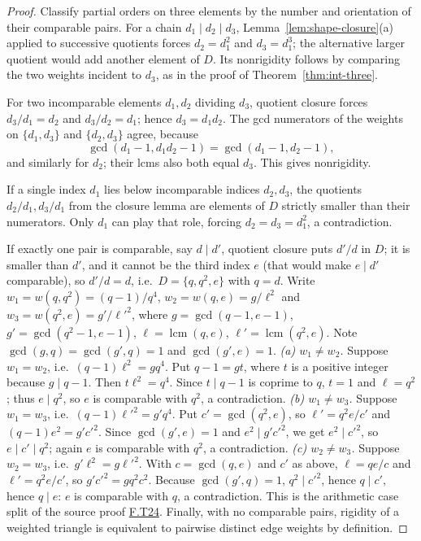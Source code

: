 \documentclass[11pt,oneside,openany]{book}
\theoremstyle{definition}
\theoremstyle{remark}
\newcommand{\lcmop}{\operatorname{lcm}}
\newcommand{\gcdop}{\operatorname{gcd}}
\newcommand{\src}[2]{\href{https://github.com/ukbbi/UNNS/blob/bb8b12d753c600c597feb00df17fe139c7cc65fa/projects/UNNS_MATH_FOUNDATIONS/sources/#1}{#2}}
\begin{document}
\begin{proof}
Classify partial orders on three elements by the number and orientation of their comparable pairs. For a chain \(d_1\mid d_2\mid d_3\), Lemma~\ref{lem:shape-closure}(a) applied to successive quotients forces \(d_2=d_1^2\) and \(d_3=d_1^3\); the alternative larger quotient would add another element of \(D\). Its nonrigidity follows by comparing the two weights incident to \(d_3\), as in the proof of Theorem~\ref{thm:int-three}.

For two incomparable elements \(d_1,d_2\) dividing \(d_3\), quotient closure forces \(d_3/d_1=d_2\) and \(d_3/d_2=d_1\); hence \(d_3=d_1d_2\). The gcd numerators of the weights on \(\{d_1,d_3\}\) and \(\{d_2,d_3\}\) agree, because
\[
 \gcdop(d_1-1,d_1d_2-1)=\gcdop(d_1-1,d_2-1),
\]
and similarly for \(d_2\); their lcms also both equal \(d_3\). This gives nonrigidity.

If a single index \(d_1\) lies below incomparable indices \(d_2,d_3\), the quotients \(d_2/d_1,d_3/d_1\) from the closure lemma are elements of \(D\) strictly smaller than their numerators. Only \(d_1\) can play that role, forcing \(d_2=d_3=d_1^2\), a contradiction.

If exactly one pair is comparable, say \(d\mid d'\), quotient closure puts \(d'/d\) in \(D\); it is smaller than \(d'\), and it cannot be the third index \(e\) (that would make \(e\mid d'\) comparable), so \(d'/d=d\), i.e.\ \(D=\{q,q^2,e\}\) with \(q=d\). Write \(w_1=w(q,q^2)=(q-1)/q^4\), \(w_2=w(q,e)=g/\ell^2\) and \(w_3=w(q^2,e)=g'/\ell'^2\), where \(g=\gcdop(q-1,e-1)\), \(g'=\gcdop(q^2-1,e-1)\), \(\ell=\lcmop(q,e)\), \(\ell'=\lcmop(q^2,e)\). Note \(\gcdop(g,q)=\gcdop(g',q)=1\) and \(\gcdop(g',e)=1\).
\emph{(a) \(w_1\ne w_2\).} Suppose \(w_1=w_2\), i.e.\ \((q-1)\ell^2=gq^4\). Put \(q-1=gt\), where \(t\) is a positive integer because \(g\mid q-1\). Then \(t\ell^2=q^4\). Since \(t\mid q-1\) is coprime to \(q\), \(t=1\) and \(\ell=q^2\); thus \(e\mid q^2\), so \(e\) is comparable with \(q^2\), a contradiction.
\emph{(b) \(w_1\ne w_3\).} Suppose \(w_1=w_3\), i.e.\ \((q-1)\ell'^2=g'q^4\). Put \(c'=\gcdop(q^2,e)\), so \(\ell'=q^2e/c'\) and \((q-1)e^2=g'c'^2\). Since \(\gcdop(g',e)=1\) and \(e^2\mid g'c'^2\), we get \(e^2\mid c'^2\), so \(e\mid c'\mid q^2\); again \(e\) is comparable with \(q^2\), a contradiction.
\emph{(c) \(w_2\ne w_3\).} Suppose \(w_2=w_3\), i.e.\ \(g'\ell^2=g\ell'^2\). With \(c=\gcdop(q,e)\) and \(c'\) as above, \(\ell=qe/c\) and \(\ell'=q^2e/c'\), so \(g'c'^2=gq^2c^2\). Because \(\gcdop(g',q)=1\), \(q^2\mid c'^2\), hence \(q\mid c'\), hence \(q\mid e\): \(e\) is comparable with \(q\), a contradiction.
This is the arithmetic case split of the source proof \src{FIELD-I/v004/THEOREMS.md}{F.T24}. Finally, with no comparable pairs, rigidity of a weighted triangle is equivalent to pairwise distinct edge weights by definition.
\end{proof}
\end{document}
